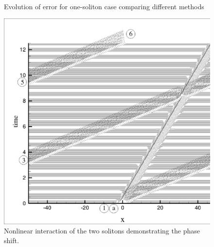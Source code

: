\begin{figure}[h!]
{
}
\caption{Evolution of error for one-soliton case comparing different methods}
\label{fig:one2}
\end{figure}

\begin{figure}[h!]
\center
\includegraphics[width=0.65\linewidth]{Fig_14}
\caption{Nonlinear interaction of the two solitons demonstrating the phase shift.}
\label{fig:twointeract}
\end{figure}

